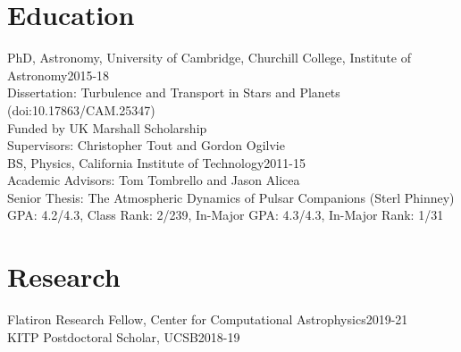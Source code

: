 \documentclass[line, margin]{res3address}
\begin{document}
\address{Home: 18 Duxbury Lane, Longmeadow, MA 01106-2006, USA}
\address{University: Churchill College, Storey's Way, Cambridge CB3 0DS, Tel 011-44-(0)-749-0397012, UK}
\address{Online: adamjermyn@gmail.com, adamjermyn.com, github.com/adamjermyn}

\begin{resume}

\section{Education}
PhD, Astronomy, University of Cambridge, Churchill College, Institute of Astronomy\hfill 2015-18\\
\phantom{4ex} Dissertation: Turbulence and Transport in Stars and Planets (doi:10.17863/CAM.25347)\\
\phantom{4ex} Funded by UK Marshall Scholarship\\
\phantom{4ex} Supervisors: Christopher Tout and Gordon Ogilvie\\
BS, Physics, California Institute of Technology\hfill 2011-15\\
\phantom{4ex} Academic Advisors: Tom Tombrello and Jason Alicea\\
\phantom{4ex} Senior Thesis: The Atmospheric Dynamics of Pulsar Companions (Sterl Phinney)\\
\phantom{4ex} GPA: 4.2/4.3, Class Rank: 2/239, In-Major GPA: 4.3/4.3, In-Major Rank: 1/31

\section{Research}
Flatiron Research Fellow, Center for Computational Astrophysics\hfill 2019-21\\
KITP Postdoctoral Scholar, UCSB\hfill 2018-19


\end{resume}
\end{document}
